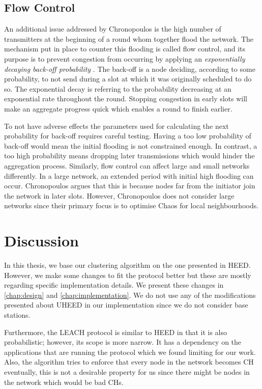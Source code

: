 
\subsection{Flow Control}
An additional issue addressed by Chronopoulos is the high number of transmitters at the beginning of a round whom together flood the network. The mechanism put in place to counter this flooding is called flow control, and its purpose is to prevent congestion from occurring by applying an \textit{exponentially decaying back-off probability} \cite{Chronopoulos2016-extreme-chaos}. The back-off is a node deciding, according to some probability, to not send during a slot at which it was originally scheduled to do so. The exponential decay is referring to the probability decreasing at an exponential rate throughout the round. Stopping congestion in early slots will make an aggregate progress quick which enables a round to finish earlier.

To not have adverse effects the parameters used for calculating the next probability for back-off requires careful testing. Having a too low probability of back-off would mean the initial flooding is not constrained enough. In contrast, a too high probability means dropping later transmissions which would hinder the aggregation process. Similarly, flow control can affect large and small networks differently. In a large network, an extended period with initial high flooding can occur. Chronopoulos argues that this is because nodes far from the initiator join the network in later slots. However, Chronopoulos does not consider large networks since their primary focus is to optimise Chaos for local neighbourhoods.

\section{Discussion}
In this thesis, we base our clustering algorithm on the one presented in HEED. However, we make some changes to fit the \atwo{} protocol better but these are mostly regarding specific implementation details. We present these changes in \cref{chap:design} and \cref{chap:implementation}. We do not use any of the modifications presented about UHEED in our implementation since we do not consider base stations.

Furthermore, the LEACH protocol is similar to HEED in that it is also probabilistic; however, its scope is more narrow. It has a dependency on the applications that are running the protocol which we found limiting for our work. Also, the algorithm tries to enforce that every node in the network becomes CH eventually, this is not a desirable property for us since there might be nodes in the network which would be bad CHs.

